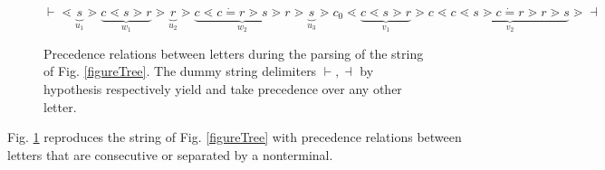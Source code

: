 \documentclass[3p,11pt]{elsarticle}
\begin{document}
\begin{figure}[h]
\begin{center}
{\begin{psmatrix}
\end{psmatrix}
}

$ \vdash \lessdot  \underbrace{s}_{u_1} \gtrdot  \underbrace{c \lessdot  s \gtrdot  r}_{w_1} \gtrdot \underbrace{r}_{u_2} \gtrdot  \underbrace{c \lessdot c \dot=r \gtrdot s\gtrdot r}_{w_2} \gtrdot \underbrace{s}_{u_3} \gtrdot c_0\lessdot  \underbrace{c\lessdot s\gtrdot r}_{v_1}\gtrdot  c \lessdot \underbrace{c\lessdot  s\gtrdot c\dot=r \gtrdot r \gtrdot s}_{v_2} \gtrdot \dashv $
\end{center}
\caption{\label{figureParsingRelations}Precedence relations between letters during the parsing of the string of Fig. \ref{figureTree}. The dummy string delimiters $\vdash, \dashv$ by hypothesis respectively yield and take precedence over any other letter. }
\end{figure}
Fig. \ref{figureParsingRelations} reproduces the string of Fig. \ref{figureTree} with precedence relations between letters that are consecutive or separated by a nonterminal.
\end{document}
